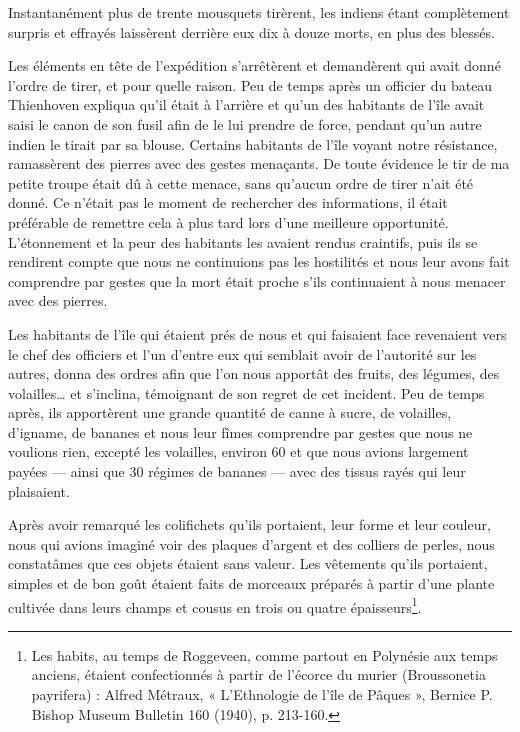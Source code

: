 \documentclass{article}
\begin{document}
        
    Instantanément plus de trente mousquets tirèrent, les indiens étant complètement surpris et effrayés laissèrent derrière eux dix à douze morts, en plus des blessés.
            
        
    Les éléments en tête de l'expédition s'arrêtèrent et demandèrent qui avait donné l'ordre de tirer, et pour quelle raison. Peu de temps après un officier du bateau Thienhoven expliqua qu'il était à l'arrière et qu'un des habitants de l'île avait saisi le canon de son fusil afin de le lui prendre de force, pendant qu'un autre indien le tirait par sa blouse. Certains habitants de l'île voyant notre résistance, ramassèrent des pierres avec des gestes menaçants. De toute évidence le tir de ma petite troupe était dû à cette menace, sans qu'aucun ordre de tirer n'ait été donné. Ce n'était pas le moment de rechercher des informations, il était préférable de remettre cela à plus tard lors d'une meilleure opportunité. L'étonnement et la peur des habitants les avaient rendus craintifs, puis ils se rendirent compte que nous ne continuions pas les hostilités et nous leur avons fait comprendre par gestes que la mort était proche s'ils continuaient à nous menacer avec des pierres.
            
        
    Les habitants de l'île qui étaient prés de nous et qui faisaient face revenaient vers le chef des officiers et l'un d'entre eux qui semblait avoir de l'autorité sur les autres, donna des ordres afin que l'on nous apportât des fruits, des légumes, des volailles… et s'inclina, témoignant de son regret de cet incident. Peu de temps après, ils apportèrent une grande quantité de canne à sucre, de volailles, d'igname, de bananes et nous leur fîmes comprendre par gestes que nous ne voulions rien, excepté les volailles, environ 60 et que nous avions largement payées — ainsi que 30 régimes de bananes — avec des tissus rayés qui leur plaisaient.
            
        
    Après avoir remarqué les colifichets qu'ils portaient, leur forme et leur couleur, nous qui avions imaginé voir des plaques d'argent et des colliers de perles, nous constatâmes que ces objets étaient sans valeur. Les vêtements qu'ils portaient, simples et de bon goût étaient faits de morceaux préparés à partir d'une plante cultivée dans leurs champs et cousus en trois ou quatre épaisseurs\footnote{Les habits, au temps de Roggeveen, comme partout en Polynésie aux temps anciens, étaient confectionnés à partir de l'écorce du murier (Broussonetia payrifera) : Alfred Métraux, « L'Ethnologie de l'île de Pâques », Bernice P. Bishop Museum Bulletin 160 (1940), p. 213-160.}.
            
\end{document}
